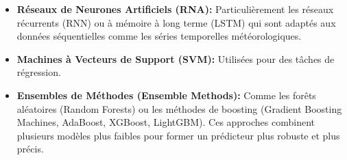 \documentclass[12pt]{article}
\begin{document}
\begin{itemize}[label=$\color{blue}\bullet$]
	\begin{itemize}[label=$\circ$]
		\item \textbf{Réseaux de Neurones Artificiels (RNA): } Particulièrement les réseaux récurrents (RNN) ou à mémoire à long terme (LSTM) qui sont adaptés aux données séquentielles comme les séries temporelles météorologiques.
		\item \textbf{Machines à Vecteurs de Support (SVM): } Utilisées pour des tâches de régression.
		\item \textbf{Ensembles de Méthodes (Ensemble Methods): } Comme les forêts aléatoires (Random Forests) ou les méthodes de boosting (Gradient Boosting Machines, AdaBoost, XGBoost, LightGBM). Ces approches combinent plusieurs modèles plus faibles pour former un prédicteur plus robuste et plus précis.
	\end{itemize}
\end{itemize}
\end{document}

